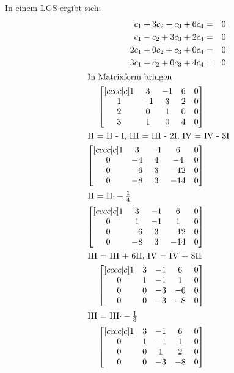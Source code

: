 \documentclass[10pt,a4paper,oneside,ngerman,numbers=noenddot]{scrartcl}
\begin{document}
\subsection{} %
In einem LGS ergibt sich: \\
\begin{alignat*}{2}
c_{1} + 3c_{2} - c_{3} + 6c_{4} &=& 0 \\
c_{1} - c_{2} + 3c_{3} + 2c_{4} &=& 0 \\
2c_{1} + 0c_{2} + c_{3} + 0c_{4} &=& 0 \\
3c_{1} + c_{2} + 0c_{3} + 4c_{4} &=& 0 \\
\intertext{In Matrixform bringen}
\begin{bmatrix}[cccc|c]
1 & 3 & -1 & 6 & 0 \\
1 & -1 & 3 & 2 & 0 \\
2 & 0 & 1 & 0 & 0 \\
3 & 1 & 0 & 4 & 0
\end{bmatrix} \\
\intertext{II = II - I, III = III - 2I, IV = IV - 3I}
\begin{bmatrix}[cccc|c]
1 & 3 & -1 & 6 & 0 \\
0 & -4 & 4 & -4 & 0 \\
0 & -6 & 3 & -12 & 0 \\
0 & -8 & 3 & -14 & 0
\end{bmatrix} \\
\intertext{II = II$ \cdot -\frac{1}{4}$}
\begin{bmatrix}[cccc|c]
1 & 3 & -1 & 6 & 0 \\
0 & 1 & -1 & 1 & 0 \\
0 & -6 & 3 & -12 & 0 \\
0 & -8 & 3 & -14 & 0
\end{bmatrix} \\
\intertext{III = III + 6II, IV = IV + 8II}
\begin{bmatrix}[cccc|c]
1 & 3 & -1 & 6 & 0 \\
0 & 1 & -1 & 1 & 0 \\
0 & 0 & -3 & -6 & 0 \\
0 & 0 & -3 & -8 & 0
\end{bmatrix} \\
\intertext{III = III$ \cdot -\frac{1}{3}$}
\begin{bmatrix}[cccc|c]
1 & 3 & -1 & 6 & 0 \\
0 & 1 & -1 & 1 & 0 \\
0 & 0 & 1 & 2 & 0 \\
0 & 0 & -3 & -8 & 0
\end{bmatrix} \\

\end{alignat*}
\end{document}
